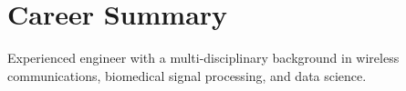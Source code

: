 \section{Career Summary}

Experienced engineer with a multi-disciplinary background in wireless communications, biomedical signal processing, and data science.
